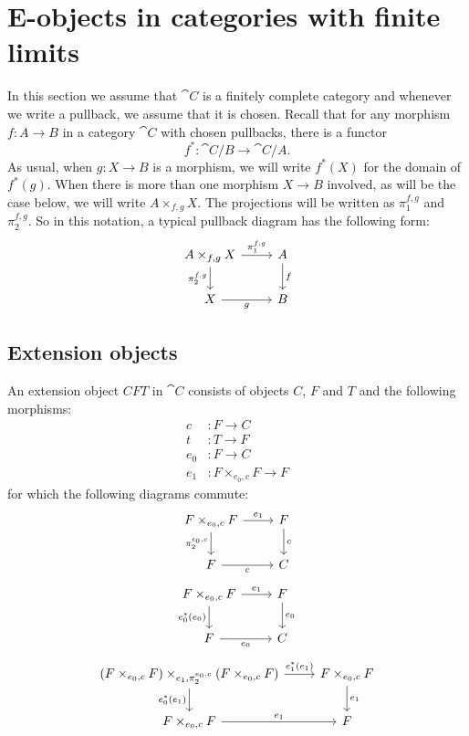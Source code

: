\section{E-objects in categories with finite limits}
In this section we assume that $\cat{C}$ is a finitely complete category and
whenever we write a pullback, we assume that it is chosen. Recall that for
any morphism $f:A\to B$ in a category $\cat{C}$ with chosen pullbacks, there
is a functor
\begin{equation*}
f^\ast : \cat{C}/B\to\cat{C}/A.
\end{equation*}
As usual, when $g:X\to B$ is a morphism, we will write $f^\ast(X)$ for the
domain of $f^\ast(g)$. When there is more than one morphism $X\to B$ involved,
as will be the case below, we will write $A\times_{f,g}X$. The projections
will be written as $\pi_1^{f,g}$ and $\pi_2^{f,g}$. So in this notation, a
typical pullback diagram has the following form:
\begin{equation*}
\begin{tikzcd}
A\times_{f,g} X
  \ar{r}{\pi_1^{f,g}}
  \ar{d}[swap]{\pi_2^{f,g}}
  &
A \ar{d}{f}
  \\
X \ar{r}[swap]{g}
  &
B
\end{tikzcd}
\end{equation*}

\subsection{Extension objects}
\begin{defn}
An extension object $CFT$ in $\cat{C}$ consists of objects $C$, $F$ and $T$ and the
following morphisms:
\begin{align*}
c &:F\to C\\
t &:T\to F\\
e_0 &:F\to C\\
e_1 & :F\times_{e_0,c} F\to F
\end{align*}
for which the following diagrams commute:
\begin{equation*}
\begin{tikzcd}
F\times_{e_0,c} F \ar{r}{e_1} \ar{d}[swap]{\pi_2^{\epsilon_0,c}} & F \ar{d}{c}\\
F \ar{r}[swap]{c} & C
\end{tikzcd}
\end{equation*}
\begin{equation*}
\begin{tikzcd}
F\times_{e_0,c} F \ar{d}[swap]{e_0^\ast(e_0)} \ar{r}{e_1} & F \ar{d}{e_0}\\
F \ar{r}[swap]{e_0} & C
\end{tikzcd}
\end{equation*}
\begin{equation*}
\begin{tikzcd}
(F\times_{e_0,c} F)\times_{e_1,\pi_2^{e_0,c}}(F\times_{e_0,c} F) 
  \ar{d}[swap]{e_0^\ast(e_1)}
  \ar{r}{e_1^\ast(e_1)}
& F\times_{e_0,c} F \ar{d}{e_1} \\
F\times_{e_0,c} F \ar{r}{e_1} & F
\end{tikzcd}
\end{equation*}
\end{defn}

